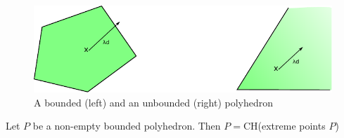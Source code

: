 \begin{figure}[hbt]
\begin{center}
\includegraphics{./images/bounded_unbounded.pdf}
\end{center}
\caption{A bounded (left) and an unbounded (right) polyhedron}
\label{Fig:bounded_unbounded}
\end{figure}

\begin{thm}\label{Thm:CH_polyhedron} Let $P$ be a non-empty bounded polyhedron. Then $P=$\mbox{CH}(extreme points $P$)
\end{thm}


